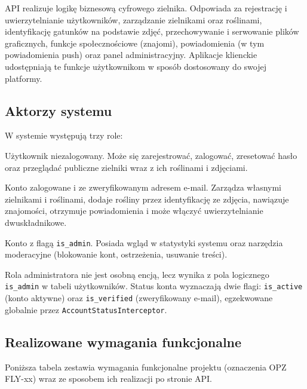 \documentclass[12pt,a4paper]{article}
\begin{document}
API realizuje logik\k{e} biznesow\k{a} cyfrowego zielnika. Odpowiada za rejestracj\k{e} i uwierzytelnianie u\.zytkownik\'ow, zarz\k{a}dzanie zielnikami oraz ro\'slinami, identyfikacj\k{e} gatunk\'ow na podstawie zdj\k{e}\'c, przechowywanie i serwowanie plik\'ow graficznych, funkcje spo\l{}eczno\'sciowe (znajomi), powiadomienia (w tym powiadomienia push) oraz panel administracyjny. Aplikacje klienckie udost\k{e}pniaj\k{a} te funkcje u\.zytkownikom w spos\'ob dostosowany do swojej platformy.

\subsection{Aktorzy systemu}

W systemie wyst\k{e}puj\k{a} trzy role:

\begin{description}[leftmargin=2cm, style=nextline]
    \item[Go\'s\'c] U\.zytkownik niezalogowany. Mo\.ze si\k{e} zarejestrowa\'c, zalogowa\'c, zresetowa\'c has\l{}o oraz przegl\k{a}da\'c publiczne zielniki wraz z ich ro\'slinami i zdj\k{e}ciami.
    \item[U\.zytkownik] Konto zalogowane i ze zweryfikowanym adresem e-mail. Zarz\k{a}dza w\l{}asnymi zielnikami i ro\'slinami, dodaje ro\'sliny przez identyfikacj\k{e} ze zdj\k{e}cia, nawi\k{a}zuje znajomo\'sci, otrzymuje powiadomienia i mo\.ze w\l{}\k{a}czy\'c uwierzytelnianie dwusk\l{}adnikowe.
    \item[Administrator] Konto z flag\k{a} \texttt{is\_admin}. Posiada wgl\k{a}d w statystyki systemu oraz narz\k{e}dzia moderacyjne (blokowanie kont, ostrze\.zenia, usuwanie tre\'sci).
\end{description}

Rola administratora nie jest osobn\k{a} encj\k{a}, lecz wynika z pola logicznego \texttt{is\_admin} w tabeli u\.zytkownik\'ow. Status konta wyznaczaj\k{a} dwie flagi: \texttt{is\_active} (konto aktywne) oraz \texttt{is\_verified} (zweryfikowany e-mail), egzekwowane globalnie przez \texttt{AccountStatusInterceptor}.

\subsection{Realizowane wymagania funkcjonalne}

Poni\.zsza tabela zestawia wymagania funkcjonalne projektu (oznaczenia OPZ \mbox{FLY-xx}) wraz ze sposobem ich realizacji po stronie API.
\end{document}
